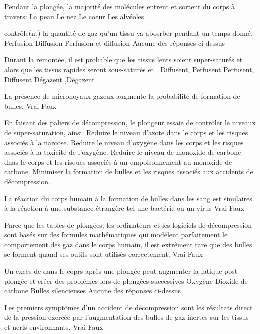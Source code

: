\documentclass[english,12pt,a4paper]{article}
\begin{document}
	\begin{outline}
		\1  Pendant la plongée, la majorité des molécules entrent et sortent du corps à travers:
			\2 La peau
			\2 Le nez
			\2 Le coeur
			\2 Les alvéoles

		\1 \underline{\hspace{1.5cm}} contrôle(nt) la quantité de gaz qu'un tissu va abosrber pendant un temps donné.
			\2 Perfusion
			\2 Diffusion
			\2 Perfusion et diffusion
			\2 Aucune des réponses ci-dessus

		\1 Durant la remontée, il est probable que les tissus lents soient super-saturés et \underline{\hspace{1.5cm}} alors que les tissus rapides seront sous-saturés et \underline{\hspace{1.5cm}}.
			\2 Diffusent, Perfusent
			\2 Perfusent, Diffusent
			\2 Dégazent
			\2 ,Dégazent

		\1 La présence de micronoyaux gazeux augmente la probabilité de formation de bulles.
			\2 Vrai
			\2 Faux

		\1 En faisant des paliers de décompression, le plongeur essaie de contrôler le niveaux de super-saturation, ainsi:
			\2 Reduire le niveau d'azote dans le corps et les risques associés à la narcose.
			\2 Reduire le niveau d'oxygène dans les corps et les risques associés à la toxicité de l'oxygène.
			\2 Reduire le niveau de monoxide de carbone dnas le corps et les risques associés à un empoisonnement au monoxide de carbone.
			\2 Minimiser la formation de bulles et les risques associés aux accidents de décompression.

		\1 La réaction du corps humain à la formation de bulles dans les sang est similaires à la réaction à une substance étrangère tel une bactérie ou un virus
			\2 Vrai
			\2 Faux

		\1 Parce que les tables de plongées, les ordinateurs et les logiciels de décompression sont basés sur des formules mathématiques qui modèlent parfaitement le comportement des gaz dans le corps humain, il est extrêment rare que des bulles se forment quand ses outils sont utilisés correctement.
			\2 Vrai
			\2 Faux

		\1 Un excès de \underline{\hspace{1.5cm}} dans le coprs après une plongée peut augmenter la fatique post-plongée et créer des problèmes lors de plongées successives
			\2 Oxygène
			\2 Dioxide de carbone
			\2 Bulles silencieuses
			\2 Aucune des réponses ci-dessus

		\1 Les premiers symptômes d'un accident de décompression sont les résultats direct de la pression exercée par l'augmentation des bulles de gaz inertes sur les tissus et nerfs environnants.
			\2 Vrai
			\2 Faux
		

\end{outline}
\end{document}
